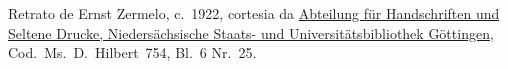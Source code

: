 Retrato de Ernst Zermelo, c.~1922, cortesia da
\href{http://www.sub.uni-goettingen.de/en/contact/departments-a-z/departmental-and-unit-details/abteilunggruppe/handschriften-und-seltene-drucke/}{Abteilung
f\"ur Handschriften und Seltene Drucke, Nieders\"achsische Staats- und
Universit\"atsbibliothek G\"ottingen}, Cod.\ Ms.\ D.~Hilbert~754,
Bl.~6 Nr.~25.
